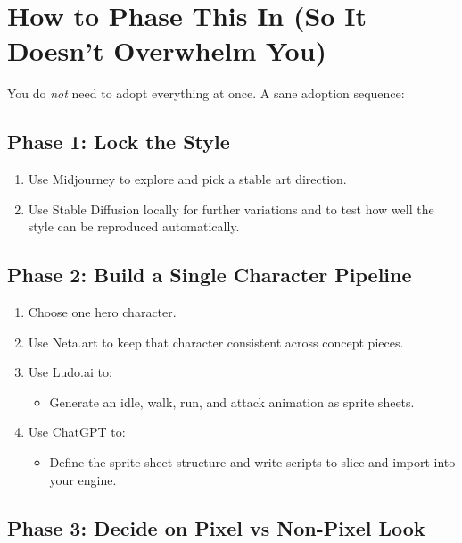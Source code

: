 \documentclass[11pt]{article}
\begin{document}
\section{How to Phase This In (So It Doesn't Overwhelm You)}

You do \emph{not} need to adopt everything at once. A sane adoption sequence:

\subsection*{Phase 1: Lock the Style}

\begin{enumerate}
    \item Use Midjourney to explore and pick a stable art direction.
    \item Use Stable Diffusion locally for further variations and to test how well the style can be reproduced automatically.
\end{enumerate}

\subsection*{Phase 2: Build a Single Character Pipeline}

\begin{enumerate}
    \item Choose one hero character.
    \item Use Neta.art to keep that character consistent across concept pieces.
    \item Use Ludo.ai to:
    \begin{itemize}
        \item Generate an idle, walk, run, and attack animation as sprite sheets.
    \end{itemize}
    \item Use ChatGPT to:
    \begin{itemize}
        \item Define the sprite sheet structure and write scripts to slice and import into your engine.
    \end{itemize}
\end{enumerate}

\subsection*{Phase 3: Decide on Pixel vs Non-Pixel Look}
\end{document}
